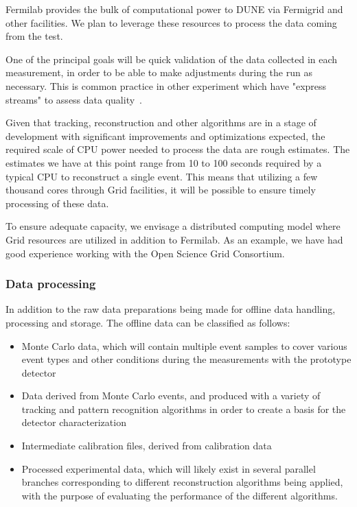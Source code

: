 Fermilab provides the bulk of computational power to DUNE via Fermigrid and other facilities. 
We plan to leverage these resources to process the data coming from the test.

One of the principal goals will be quick validation of the data collected in each measurement, in
order to be able to make adjustments during the run as necessary. 
This is common practice in other experiment which have "express streams" to assess data quality~\cite{atlas_express}.


Given that tracking, reconstruction and other algorithms are in a stage of development with significant improvements
and optimizations expected, the required scale of CPU power needed to process the data are rough estimates.
The estimates we have at this point range from 10 to 100 seconds required by a typical
CPU to reconstruct a single event. 
This means that utilizing a few thousand cores through Grid facilities, it will be possible to ensure timely processing of these data.

To ensure adequate capacity, we envisage a distributed computing model where Grid resources are utilized in addition to Fermilab.
As an example, we have had good experience working with the Open Science Grid Consortium.


\subsubsection{Data processing}
\label{dataprocess}

In addition to the raw data preparations being made for offline data handling, processing and storage.
The offline data can be classified as follows:
\begin{itemize}
\item Monte Carlo data, which will contain multiple event samples to cover various event types and other conditions during the measurements with the prototype detector
\item Data derived from Monte Carlo events, and produced with a variety of tracking and pattern recognition algorithms in order to create a basis for the detector characterization
\item Intermediate calibration files, derived from calibration data
\item Processed experimental data, which will likely exist in several parallel branches corresponding to different reconstruction algorithms being applied, with the purpose of evaluating the performance of the different algorithms.
\end{itemize}

